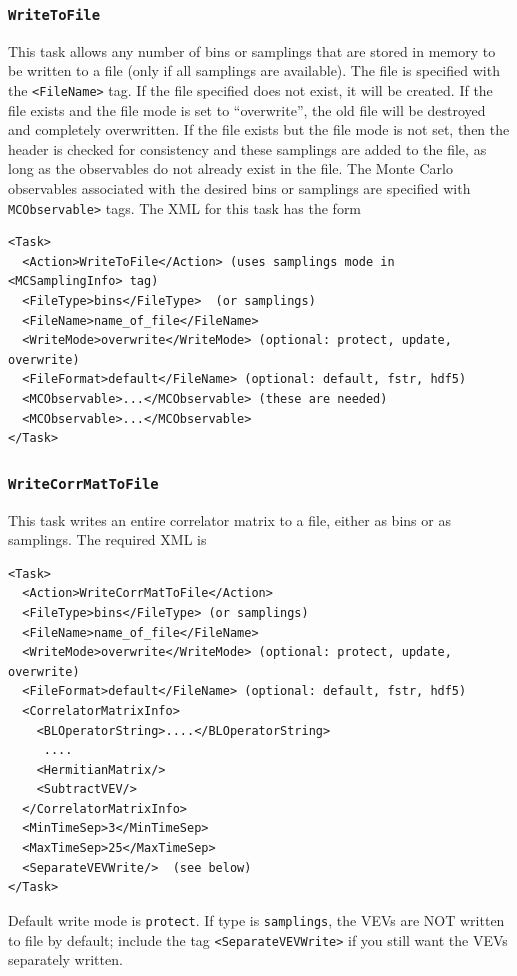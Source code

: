 \documentclass[12pt]{article}
\newcommand{\vb}{\texttt}
\begin{document}
\subsubsection{\vb{WriteToFile}}
This task allows any number of bins or samplings that are stored in memory to be written
to a file (only if all samplings are available).
The file is specified with the \vb{<FileName>} tag.
If the file specified does not exist, it will be created. If the file
exists and the file mode is set to ``overwrite'', the old file will be destroyed
and completely overwritten.  If the file exists but the file mode is not set,
then the header is checked for consistency and these
samplings are added to the file, as long as the observables do
not already exist in the file.
The Monte Carlo observables associated with the desired bins or samplings are
specified with \vb{MCObservable>} tags.
The XML for this task has the form
\begin{verbatim}
<Task>
  <Action>WriteToFile</Action> (uses samplings mode in <MCSamplingInfo> tag)
  <FileType>bins</FileType>  (or samplings)
  <FileName>name_of_file</FileName>
  <WriteMode>overwrite</WriteMode> (optional: protect, update, overwrite) 
  <FileFormat>default</FileName> (optional: default, fstr, hdf5)
  <MCObservable>...</MCObservable> (these are needed)
  <MCObservable>...</MCObservable>
</Task>
\end{verbatim}

\subsubsection{\vb{WriteCorrMatToFile}}
This task writes an entire correlator matrix to a file, either as bins or
as samplings.  The required XML is
\begin{verbatim}
<Task>
  <Action>WriteCorrMatToFile</Action>
  <FileType>bins</FileType> (or samplings)
  <FileName>name_of_file</FileName>
  <WriteMode>overwrite</WriteMode> (optional: protect, update, overwrite) 
  <FileFormat>default</FileName> (optional: default, fstr, hdf5)
  <CorrelatorMatrixInfo>
    <BLOperatorString>....</BLOperatorString>
     ....
    <HermitianMatrix/>
    <SubtractVEV/>
  </CorrelatorMatrixInfo>
  <MinTimeSep>3</MinTimeSep>
  <MaxTimeSep>25</MaxTimeSep>
  <SeparateVEVWrite/>  (see below)
</Task>            
\end{verbatim}
Default write mode is \vb{protect}.  If type is \vb{samplings}, the VEVs are 
NOT written to file by default; include the tag \vb{<SeparateVEVWrite>} if you 
still want the VEVs separately written.
\end{document}

